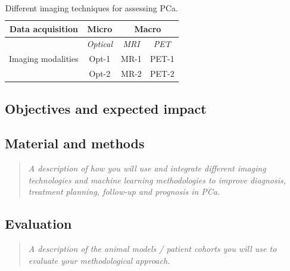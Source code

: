 \documentclass[11pt]{article}
\begin{document}
\begin{table}[H]
\begin{center}
\begin{tabular}{ |c|c|c|c| } 
\hline
{\bf Data acquisition} & {\bf Micro} & \multicolumn{2}{c|}{\bf Macro} \\
\hline
\multirow{3}{4em}{Imaging modalities} & {\it Optical} & {\it MRI}  & {\it PET} \\ 
& Opt-1 & MR-1  & PET-1\\ 
& Opt-2 & MR-2  & PET-2\\ 
\hline
\end{tabular}
\caption{Different imaging techniques for assessing PCa.}
\label{tab:imaging}
\end{center}
\end{table}


\subsection{Objectives and expected impact}

\vspace{3mm}

\subsection{Material and methods}

\begin{quote}
{\scriptsize \it A description of how you will use and integrate different imaging technologies and machine learning methodologies to improve diagnosis, treatment planning, follow-up and prognosis in PCa.}
\end{quote}

\vspace{3mm}

\subsection{Evaluation} 

\begin{quote}
{\scriptsize \it A description of the animal models / patient cohorts you will use to evaluate your methodological approach.}
\end{quote}
\end{document}
